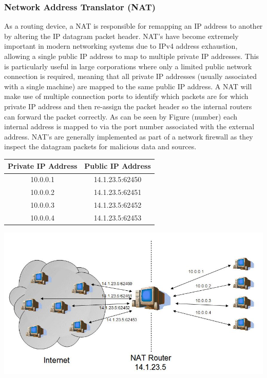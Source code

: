 \documentclass[a4paper, titlepage]{article}
\begin{document}
\subsubsection{Network Address Translator (NAT)}
As a routing device, a NAT is responsible for remapping an IP address to another by altering the IP datagram packet header. NAT's have become extremely important in modern networking systems due to IPv4 address exhaustion, allowing a single public IP address to map to multiple private IP addresses. This is particularly useful in large corporations where only a limited public network connection is required, meaning that all private IP addresses (usually associated with a single machine) are mapped to the same public IP address. A NAT will make use of multiple connection ports to identify which packets are for which private IP address and then re-assign the packet header so the internal routers can forward the packet correctly. As can be seen by Figure (number) each internal address is mapped to via the port number associated with the external address. NAT's are generally implemented as part of a network firewall as they inspect the datagram packets for malicious data and sources.

\begin{center}
	\begin{tabular} { | c | c | }
		\hline
		\textbf{Private IP Address} & \textbf{Public IP Address} \\
		\hline
		10.0.0.1 & 14.1.23.5:62450 \\
		\hline
		10.0.0.2 & 14.1.23.5:62451 \\
		\hline
		10.0.0.3 & 14.1.23.5:62452 \\
		\hline
		10.0.0.4 & 14.1.23.5:62453 \\
		\hline
	\end{tabular}
\end{center}

\includegraphics[width=\textwidth]{images/nat.jpg}
\end{document}
